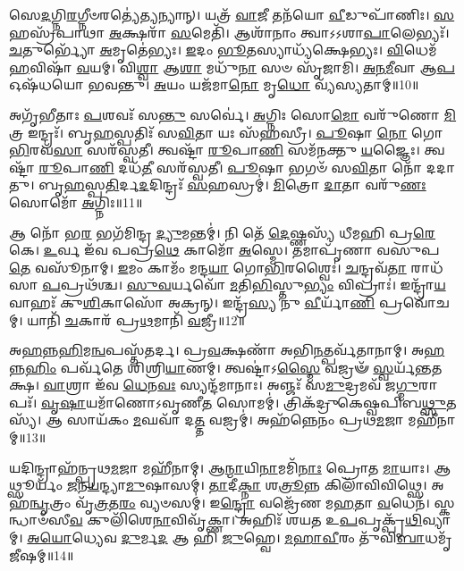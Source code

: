 𑌸𑍇\-\ul{𑌦}\-𑌗𑍍𑌨𑌿\-\ul{𑌰}\-𑌗𑍍𑌨𑍀𑍞𑌰𑌤𑍍𑌯𑍇॑\-\ul{𑌤𑍍𑌯}\-𑌨𑍍𑌯𑌾𑌨𑍍।
𑌯𑌤𑍍𑌰᳴ \ul{𑌵𑌾}\-𑌜𑍀 𑌤𑌨᳴𑌯𑍋 \ul{𑌵𑍀}\-𑌡𑍁𑌪𑌾᳴𑌣𑌿𑌃।
\-\ul{𑌸}\-𑌹𑌸𑍍𑌰᳴𑌪𑌾𑌥𑌾 \ul{𑌅}\-𑌕𑍍𑌷𑌰𑌾᳴ \ul{𑌸}\-𑌮𑍇𑌤𑌿᳴।
𑌆𑌶𑌾᳴𑌨𑌾𑌂 𑌤𑍍𑌵𑌾\-𑌽𑌽𑌶𑌾\-\ul{𑌪𑌾}\-𑌲𑍇𑌭𑍍𑌯𑌃᳴।
\-\ul{𑌚}\-𑌤𑍁𑌰𑍍𑌭𑍍𑌯𑍋᳴ \ul{𑌅}\-𑌮𑍃𑌤𑍇॑𑌭𑍍𑌯𑌃।
\-\ul{𑌇}\-𑌦𑌂 \ul{𑌭𑍂}\-𑌤𑌸𑍍𑌯𑌾𑌧𑍍𑌯᳴𑌕𑍍𑌷𑍇𑌭𑍍𑌯𑌃।
\-\ul{𑌵𑌿}\-𑌧𑍇𑌮᳴ \ul{𑌹}\-𑌵𑌿𑌷𑌾᳴ \ul{𑌵}\-𑌯𑌮𑍍।
𑌵𑌿\-\ul{𑌶𑍍𑌵𑌾} 𑌆\-\ul{𑌶𑌾} 𑌮𑌧𑍁᳴\-\ul{𑌨𑌾} 𑌸𑍞 𑌸𑍃᳴𑌜𑌾𑌮𑌿।
\-\ul{𑌅}\-\-\ul{𑌨}\-\-\ul{𑌮𑍀}\-𑌵𑌾 𑌆\-\ul{𑌪} 𑌓𑌷᳴𑌧𑌯𑍋 𑌭𑌵𑌨𑍍𑌤𑍁।
\-\ul{𑌅}\-𑌯𑌂 𑌯𑌜᳴𑌮𑌾\-\ul{𑌨𑍋} 𑌮𑍃\-\ul{𑌧𑍋} 𑌵𑍍𑌯᳴𑌸𑍍𑌯𑌤𑌾𑌮𑍍॥10॥

𑌅𑌗𑍃᳴𑌭𑍀𑌤𑌾𑌃 \ul{𑌪}\-𑌶𑌵𑌃᳴ 𑌸\-\ul{𑌨𑍍𑌤𑍁} 𑌸𑌰𑍍𑌵𑍇॑।
\-\ul{𑌅}\-𑌗𑍍𑌨𑌿𑌃 𑌸𑍋\-\ul{𑌮𑍋} 𑌵𑌰𑍁᳴𑌣𑍋 \ul{𑌮𑌿}\-𑌤𑍍𑌰 𑌇𑌨𑍍𑌦𑍍𑌰𑌃᳴।
𑌬𑍃\-\ul{𑌹}\-𑌸𑍍𑌪𑌤𑌿𑌃᳴ 𑌸\-\ul{𑌵𑌿}\-𑌤𑌾 𑌯𑌃 𑌸᳴\-\ul{𑌹}\-𑌸𑍍𑌰𑍀।
\-\ul{𑌪𑍂}\-𑌷𑌾 \ul{𑌨𑍋} 𑌗𑍋\-\ul{𑌭𑌿}\-𑌰𑌵᳴\-\ul{𑌸𑌾} 𑌸𑌰᳴𑌸𑍍𑌵𑌤𑍀।
𑌤𑍍𑌵𑌷𑍍𑌟𑌾᳴ \ul{𑌰𑍂}\-𑌪𑌾\-\ul{𑌣𑌿} 𑌸𑌮᳴𑌨𑌕𑍍𑌤𑍁 \ul{𑌯}\-𑌜𑍍𑌞𑍈𑌃।
𑌤𑍍𑌵𑌷𑍍𑌟𑌾᳴ \ul{𑌰𑍂}\-𑌪𑌾\-\ul{𑌣𑌿} 𑌦𑌧᳴\-\ul{𑌤𑍀} 𑌸𑌰᳴𑌸𑍍𑌵𑌤𑍀।
\-\ul{𑌪𑍂}\-𑌷𑌾 𑌭𑌗𑍞᳴ 𑌸\-\ul{𑌵𑌿}\-𑌤𑌾 𑌨𑍋᳴ 𑌦𑌦𑌾𑌤𑍁।
𑌬𑍃\-\ul{𑌹}\-𑌸𑍍𑌪\-\ul{𑌤𑌿}\-𑌰𑍍𑌦\-\ul{𑌦}\-𑌦𑌿𑌨𑍍𑌦𑍍𑌰𑌃᳴ \ul{𑌸}\-𑌹𑌸𑍍𑌰𑌮𑍍॑।
\-\ul{𑌮𑌿}\-𑌤𑍍𑌰𑍋 \ul{𑌦𑌾}\-𑌤𑌾 𑌵𑌰𑍁᳴\-\ul{𑌣𑌃} 𑌸𑍋𑌮𑍋᳴ \ul{𑌅}\-𑌗𑍍𑌨𑌿𑌃॥11॥\anuvakamend[\-\ul{𑌕}\-\-\ul{𑌰}\-𑌨𑍍𑌨𑌿𑌵𑌿᳴𑌷𑍍𑌟𑌮𑌸𑍍𑌯\-\ul{𑌤𑌾}\-𑌨𑍍𑌨𑌵᳴ 𑌚]

𑌆 𑌨𑍋᳴ 𑌭\-\ul{𑌰} 𑌭𑌗᳴𑌮𑌿𑌨𑍍𑌦𑍍𑌰 \ul{𑌦𑍍𑌯𑍁}\-𑌮𑌨𑍍𑌤𑌮𑍍॑।
𑌨𑌿 𑌤𑍇᳴ \ul{𑌦𑍇}\-𑌷𑍍𑌣𑌸𑍍𑌯᳴ 𑌧𑍀𑌮𑌹𑌿 𑌪𑍍𑌰\-\ul{𑌰𑍇}\-𑌕𑍇।
\-\ul{𑌉}\-𑌰𑍍𑌵 𑌇᳴𑌵 𑌪𑌪𑍍𑌰\-\ul{𑌥𑍇} 𑌕𑌾𑌮𑍋᳴ \ul{𑌅}\-𑌸𑍍𑌮𑍇।
𑌤𑌮𑌾𑌪𑍃᳴𑌣𑌾 𑌵𑌸𑍁𑌪\-\ul{𑌤𑍇} 𑌵𑌸𑍂᳴𑌨𑌾𑌮𑍍।
\-\ul{𑌇}\-𑌮𑌂 𑌕𑌾𑌮𑌂᳴ 𑌮𑌨𑍍𑌦\-\ul{𑌯𑌾} 𑌗𑍋\-\ul{𑌭𑌿}\-𑌰𑌶𑍍𑌵𑍈𑌃॑।
\-\ul{𑌚}\-𑌨𑍍𑌦𑍍𑌰𑌵᳴\-\ul{𑌤𑌾} 𑌰𑌾𑌧᳴𑌸𑌾 \ul{𑌪}\-𑌪𑍍𑌰𑌥᳴𑌶𑍍𑌚।
\-\ul{𑌸𑍁}\-\-\ul{𑌵}\-𑌰𑍍𑌯𑌵𑍋᳴ \ul{𑌮}\-𑌤𑌿\-\ul{𑌭𑌿}\-𑌸𑍍𑌤𑍁\-\ul{𑌭𑍍𑌯𑌂} 𑌵𑌿𑌪𑍍𑌰𑌾𑌃॑।
𑌇𑌨𑍍𑌦𑍍𑌰𑌾᳴\-\ul{𑌯} 𑌵𑌾𑌹𑌃᳴ 𑌕𑍁\-\ul{𑌶𑌿}\-𑌕𑌾𑌸𑍋᳴ 𑌅𑌕𑍍𑌰𑌨𑍍।
𑌇𑌨𑍍𑌦𑍍𑌰᳴\-\ul{𑌸𑍍𑌯} 𑌨𑍁 \ul{𑌵𑍀}\-𑌰𑍍𑌯𑌾᳴\-\ul{𑌣𑌿} 𑌪𑍍𑌰𑌵𑍋᳴𑌚𑌮𑍍।
𑌯𑌾𑌨𑌿᳴ \ul{𑌚}\-𑌕𑌾𑌰᳴ 𑌪𑍍𑌰\-\ul{𑌥}\-𑌮𑌾𑌨𑌿᳴ \ul{𑌵}\-𑌜𑍍𑌰𑍀॥12॥

𑌅\-\ul{𑌹}\-𑌨𑍍𑌨\-\ul{𑌹𑌿}\-𑌮\-\ul{𑌨𑍍𑌵}\-𑌪𑌸𑍍𑌤᳴𑌤𑌰𑍍𑌦।
𑌪𑍍𑌰\-\ul{𑌵}\-𑌕𑍍𑌷𑌣𑌾᳴ 𑌅𑌭𑌿\-\ul{𑌨}\-𑌤𑍍𑌪𑌰𑍍𑌵᳴𑌤𑌾𑌨𑌾𑌮𑍍।
𑌅\-\ul{𑌹}\-𑌨𑍍𑌨\-\ul{𑌹𑌿𑌂} 𑌪𑌰𑍍𑌵᳴𑌤𑍇 𑌶𑌿𑌶𑍍𑌰𑌿\-\ul{𑌯𑌾}\-𑌣𑌮𑍍।
𑌤𑍍𑌵𑌷𑍍𑌟𑌾॑\-𑌽\-\ul{𑌸𑍍𑌮𑍈} 𑌵𑌜𑍍𑌰𑍟᳴ \ul{𑌸𑍍𑌵}\-𑌰𑍍𑌯᳴𑌨𑍍𑌤𑌤𑌕𑍍𑌷।
\-\ul{𑌵𑌾}\-𑌶𑍍𑌰𑌾 𑌇᳴𑌵 \ul{𑌧𑍇}\-𑌨\-\ul{𑌵𑌃} 𑌸𑍍𑌯𑌨𑍍𑌦᳴𑌮𑌾𑌨𑌾𑌃।
𑌅𑌞𑍍𑌜𑌃᳴ 𑌸\-\ul{𑌮𑍁}\-𑌦𑍍𑌰𑌮𑌵᳴ 𑌜\-\ul{𑌗𑍍𑌮𑍁}\-𑌰𑌾𑌪𑌃᳴।
\-\ul{𑌵𑍃}\-\-\ul{𑌷𑌾}\-𑌯𑌮𑌾᳴𑌣𑍋\-𑌽𑌵𑍃𑌣𑍀\-\ul{𑌤} 𑌸𑍋𑌮𑌮𑍍॑।
𑌤𑍍𑌰𑌿𑌕᳴𑌦𑍍𑌰𑍁𑌕𑍇𑌷𑍍𑌵𑌪𑌿𑌬\-\ul{𑌥𑍍𑌸𑍁}\-𑌤𑌸𑍍𑌯᳴।
𑌆 𑌸𑌾𑌯᳴𑌕𑌂 \ul{𑌮}\-𑌘𑌵𑌾᳴ 𑌦\-\ul{𑌤𑍍𑌤} 𑌵𑌜𑍍𑌰𑌮𑍍॑।
𑌅𑌹᳴𑌨𑍍𑌨𑍇𑌨𑌂 𑌪𑍍𑌰𑌥\-\ul{𑌮}\-𑌜𑌾 𑌮𑌹𑍀᳴𑌨𑌾𑌮𑍍॥13॥

𑌯𑌦𑌿𑌨𑍍𑌦𑍍𑌰𑌾𑌹᳴𑌨𑍍𑌪𑍍𑌰𑌥\-\ul{𑌮}\-𑌜𑌾 𑌮𑌹𑍀᳴𑌨𑌾𑌮𑍍।
𑌆\-\ul{𑌨𑍍𑌮𑌾}\-𑌯𑌿\-\ul{𑌨𑌾}\-𑌮𑌮𑌿᳴\-\ul{𑌨𑌾𑌃} 𑌪𑍍𑌰𑍋𑌤 \ul{𑌮𑌾}\-𑌯𑌾𑌃।
𑌆𑌥𑍍𑌸𑍂𑌰𑍍𑌯𑌂᳴ \ul{𑌜}\-𑌨\-\ul{𑌯}\-𑌨𑍍𑌦𑍍𑌯𑌾\-\ul{𑌮𑍁}\-𑌷𑌾𑌸𑌮𑍍॑।
\-\ul{𑌤𑌾}\-𑌦𑍀\-\ul{𑌕𑍍𑌨𑌾} 𑌶\-\ul{𑌤𑍍𑌰𑍂}\-𑌨𑍍𑌨 𑌕𑌿𑌲𑌾᳴𑌵𑌿𑌵𑌿𑌥𑍍𑌸𑍇।
𑌅𑌹᳴\-\ul{𑌨𑍍𑌵𑍃}\-𑌤𑍍𑌰𑌂 𑌵𑍃᳴\-\ul{𑌤𑍍𑌰}\-𑌤\-\ul{𑌰𑌂} 𑌵𑍍𑌯𑍞𑌸𑌮𑍍॑।
𑌇\-\ul{𑌨𑍍𑌦𑍍𑌰𑍋} 𑌵𑌜𑍍𑌰𑍇᳴𑌣 𑌮\-\ul{𑌹}\-𑌤𑌾 \ul{𑌵}\-𑌧𑍇𑌨᳴।
𑌸𑍍𑌕𑌨𑍍𑌧𑌾𑍞᳴𑌸𑍀\-\ul{𑌵} 𑌕𑍁𑌲𑌿᳴𑌶𑍇\-\ul{𑌨𑌾}\-𑌵𑌿𑌵𑍃᳴𑌕𑍍𑌣𑌾।
𑌅𑌹𑌿𑌃᳴ 𑌶𑌯𑌤 𑌉\-\ul{𑌪}\-𑌪𑍃𑌕𑍍𑌪𑍃᳴\-\ul{𑌥𑌿}\-𑌵𑍍𑌯𑌾𑌮𑍍।
\-\ul{𑌅}\-\-\ul{𑌯𑍋}\-𑌧𑍍𑌯𑍇𑌵 \ul{𑌦𑍁}\-𑌰𑍍𑌮\-\ul{𑌦} 𑌆 𑌹𑌿 \ul{𑌜𑍁}\-𑌹𑍍𑌵𑍇।
\-\ul{𑌮}\-\-\ul{𑌹𑌾}\-\-\ul{𑌵𑍀}\-𑌰𑌂 𑌤𑍁᳴𑌵𑌿\-\ul{𑌬𑌾}\-𑌧𑌮𑍃᳴\-\ul{𑌜𑍀}\-𑌷𑌮𑍍॥14॥

